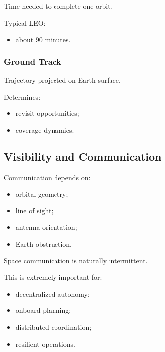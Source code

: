 \documentclass[10pt,a4paper,twocolumn]{article}
\begin{document}
Time needed to complete one orbit.

Typical LEO:
\begin{itemize}
    \item about 90 minutes.
\end{itemize}


\subsubsection*{Ground Track}

Trajectory projected on Earth surface.

Determines:
\begin{itemize}
    \item revisit opportunities;
    \item coverage dynamics.
\end{itemize}


\subsection{Visibility and Communication}

Communication depends on:
\begin{itemize}
    \item orbital geometry;
    \item line of sight;
    \item antenna orientation;
    \item Earth obstruction.
\end{itemize}

\begin{keybox}
    Space communication is naturally intermittent.
\end{keybox}

This is extremely important for:
\begin{itemize}
    \item decentralized autonomy;
    \item onboard planning;
    \item distributed coordination;
    \item resilient operations.
\end{itemize}

\end{document}
